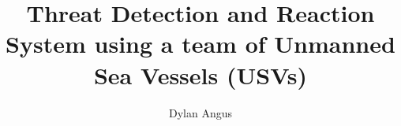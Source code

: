 \documentclass[bsc,frontabs,twoside,singlespacing,parskip,deptreport]{infthesis}     %
\begin{document}
\title{Threat Detection and Reaction System using a team of Unmanned Sea Vessels (USVs) }

\author{Dylan Angus}










\end{document}
